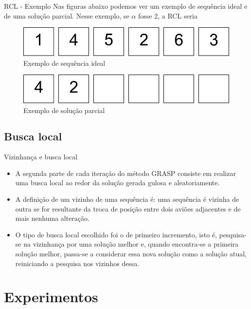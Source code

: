 \documentclass[xcolor=dvipsnames]{beamer}
\begin{document}
\begin{frame}{RCL - Exemplo}
 Nas figuras abaixo podemos ver um exemplo de sequência ideal e de uma solução parcial. Nesse exemplo, se $\alpha$ fosse 2, a RCL seria 
\begin{figure}[h]
      \includegraphics[scale=0.4]{seq.pdf}
     \caption{Exemplo de sequência ideal}
     \label{im4}
\end{figure}
\begin{figure}[h]
      \includegraphics[scale=0.4]{solpar.pdf}
     \caption{Exemplo de solução parcial}
     \label{im5}
\end{figure}
\end{frame}

\subsection{Busca local}

\begin{frame}{Vizinhança e busca local}
 \begin{itemize}[<+-| alert@+>]
  \item{A segunda parte de cada iteração do método GRASP consiste em realizar uma busca local ao redor da solução gerada gulosa e aleatoriamente.}
  \item{A definição de um vizinho de uma sequência é: uma sequência é vizinha de outra se for resultante da troca de posição entre dois aviões adjacentes e de mais nenhuma alteração.}
  \item{O tipo de busca local escolhido foi o de primeiro incremento, isto é, pesquisa-se na vizinhança por uma solução melhor e, quando encontra-se a primeira solução melhor, passa-se a considerar essa nova solução como a solução atual, reiniciando a pesquisa nos vizinhos dessa.} 
\end{itemize}  
\end{frame}

\section{Experimentos}
\end{document}
